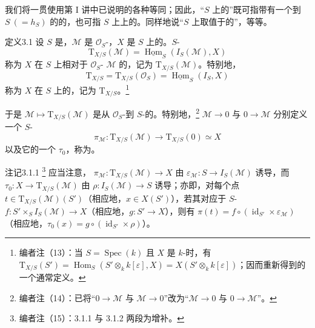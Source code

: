 我们将一贯使用第 I 讲中已说明的各种等同；因此，“$S$ 上的”既可指带有一个到 $S\ (=h_S)$ 的的，也可指 $S$ 上上的。同样地说“$S$ 上取值于的”，等等。
\begin{SGAresult}{定义}{3.1}
设 $S$ 是，$\mathcal M$ 是 $\mathcal O_S$-，$X$ 是 $S$ 上的。$S$-
\[
\mathrm T_{X/S}(\mathcal M)=\underline{\operatorname{Hom}}_S(I_S(\mathcal M),X)
\]
称为 $X$ 在 $S$ 上相对于 $\mathcal O_S$- $\mathcal M$ 的，记为 $\mathrm T_{X/S}(\mathcal M)$。特别地，
\[
\mathrm T_{X/S}=\mathrm T_{X/S}(\mathcal O_S)=\underline{\operatorname{Hom}}_S(I_S,X)
\]
称为 $X$ 在 $S$ 上的，记为 $\mathrm T_{X/S}$。\footnote{编者注（13）：当 $S=\operatorname{Spec}(k)$ 且 $X$ 是 $k$-时，有 $\mathrm T_{X/S}(S')=\operatorname{Hom}_S(S'\otimes_k k[\varepsilon],X)=X(S'\otimes_k k[\varepsilon])$；因而重新得到的一个通常定义。}
\end{SGAresult}
于是 $\mathcal M\mapsto\mathrm T_{X/S}(\mathcal M)$ 是从 $\mathcal O_S$-到 $S$-的。特别地，\footnote{编者注（14）：已将“$0\to\mathcal M$ 与 $\mathcal M\to0$”改为“$\mathcal M\to0$ 与 $0\to\mathcal M$”。} $\mathcal M\to0$ 与 $0\to\mathcal M$ 分别定义一个 $S$-
\[
\pi_{\mathcal M}:\mathrm T_{X/S}(\mathcal M)\longrightarrow\mathrm T_{X/S}(0)\simeq X
\]
以及它的一个 $\tau_0$，称为。
\begin{SGAresult}{注记}{3.1.1}
\footnote{编者注（15）：3.1.1 与 3.1.2 两段为增补。} 应当注意， $\pi_{\mathcal M}:\mathrm T_{X/S}(\mathcal M)\to X$ 由 $\varepsilon_{\mathcal M}:S\to I_S(\mathcal M)$ 诱导，而 $\tau_0:X\to\mathrm T_{X/S}(\mathcal M)$ 由 $\rho:I_S(\mathcal M)\to S$ 诱导；亦即，对每个点 $t\in\mathrm T_{X/S}(\mathcal M)(S')$（相应地，$x\in X(S')$），若其对应于 $S$- $f:S'\times_S I_S(\mathcal M)\to X$（相应地，$g:S'\to X$），则有 $\pi(t)=f\circ(\operatorname{id}_{S'}\times\varepsilon_{\mathcal M})$（相应地，$\tau_0(x)=g\circ(\operatorname{id}_{S'}\times\rho)$）。
\end{SGAresult}
